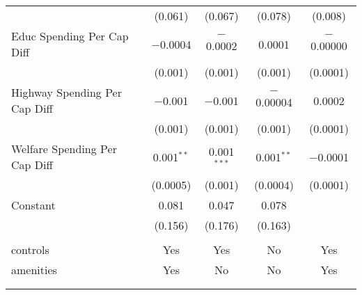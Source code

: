 \begin{table}[!htbp]
\begin{tabular}{@{\extracolsep{5pt}}lcccc}
  & (0.061) & (0.067) & (0.078) & (0.008) \\ 
  Educ Spending Per Cap Diff & $-$0.0004 & $-$0.0002 & 0.0001 & $-$0.00000 \\ 
  & (0.001) & (0.001) & (0.001) & (0.0001) \\ 
  Highway Spending Per Cap Diff & $-$0.001 & $-$0.001 & $-$0.00004 & 0.0002 \\ 
  & (0.001) & (0.001) & (0.001) & (0.0001) \\ 
  Welfare Spending Per Cap Diff & 0.001$^{**}$ & 0.001$^{***}$ & 0.001$^{**}$ & $-$0.0001 \\ 
  & (0.0005) & (0.001) & (0.0004) & (0.0001) \\ 
  Constant & 0.081 & 0.047 & 0.078 &  \\ 
  & (0.156) & (0.176) & (0.163) &  \\ 
 \hline \\[-1.8ex] 
controls & Yes & Yes & No & Yes \\ 
amenities & Yes & No & No & Yes \\ 
\hline \\[-1.8ex] 
\hline 
\hline \\[-1.8ex] 
\end{tabular} 
\end{table} 
